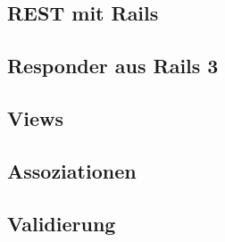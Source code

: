 \subsection{REST mit Rails}


\subsection{Responder aus Rails 3}


\subsection{Views}


\subsection{Assoziationen}


\subsection{Validierung}



